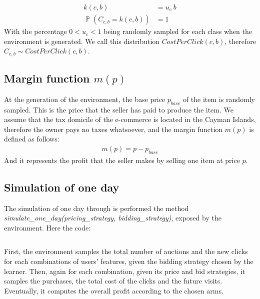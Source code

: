 \documentclass[11pt]{article} %
\DeclareMathOperator{\Prob}{\mathbb{P}}
\begin{document}
\begin{align*}
k(c,b) &= u_c\  b\\
\Prob(C_{c,b} = k(c,b)) &= 1
\end{align*}
With the percentage $0 < u_c < 1$ being randomly sampled for each class when the environment is generated.
We call this distribution $CostPerClick(c,b)$, therefore $C_{c,b}\sim CostPerClick(c,b)$.

\subsection{Margin function $m(p)$}
At the generation of the environment, the base price $p_{base}$ of the item is randomly sampled. This is the price that the seller has paid to produce the item. We assume that the tax domicile of the e-commerce is located in the Cayman Islands, therefore the owner pays no taxes whatsoever, and the margin function $m(p)$ is defined as follows:
\begin{align*}
m(p)=p-p_{base}
\end{align*}
And it represents the profit that the seller makes by selling one item at price $p$.

\subsection{Simulation of one day}
The simulation of one day through is performed the method \textit{simulate\_one\_day(pricing\_strategy, bidding\_strategy)}, exposed by the environment.
\newline
Here the code:
\inputminted[fontsize=\footnotesize]{python}{code/simulation_one_day.py}
First, the environment samples the total number of auctions and the new clicks for each combinations of users' features, given the bidding strategy chosen by the learner. Then, again for each combination, given its price and bid strategies, it samples the purchases, the total cost of the clicks and the future visits. Eventually, it computes the overall profit according to the chosen arms.

\clearpage
\end{document}
